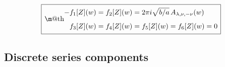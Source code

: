 \documentclass[11pt]{article}
\makeatletter
\newcommand*{\wideboxed}[1]{\setlength{\fboxsep}{1ex}%
  \fbox{\m@th$\displaystyle#1$}}
\makeatother
\begin{document}
\begin{equation} \label{Zwf}
\wideboxed{
\begin{aligned}
-f_{1}[Z](w)&=f_{2}[Z](w)=2\pi i\sqrt{b/a}\,A_{\lambda,\nu,-\nu}(w)
\\[5pt]
f_{3}[Z](w)&=f_{4}[Z](w)=f_{5}[Z](w)=f_{6}[Z](w)=0
\end{aligned}
}
\end{equation}

\subsection{Discrete series components} \label{app:disc}
\end{document}
